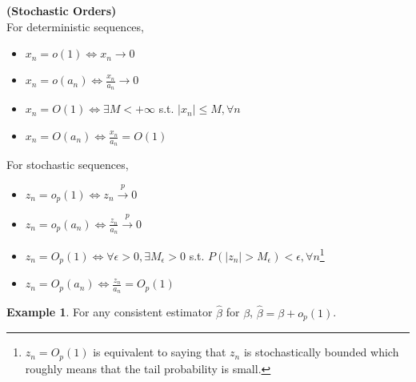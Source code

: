 \documentclass[11pt]{article} %
\theoremstyle{definition}
\numberwithin{defn}{subsection}
\numberwithin{thm}{subsection}
\newtheorem*{rmk}{Remark}
\newtheorem{ex}{Example}
\numberwithin{ex}{subsection}
\newcommand{\plim}{\overset{p}{\rightarrow}}
\begin{document}
\begin{defn}\textbf{(Stochastic Orders)}\\
	For deterministic sequences,
	\begin{itemize}
		\item $x_n=o(1)\iff x_n\rightarrow0$
		\item $x_n=o(a_n)\iff \frac{x_n}{a_n}\rightarrow 0$
		\item $x_n=O(1) \iff \exists M<+\infty$ s.t. $|x_n|\le M,\forall n$
		\item $x_n=O(a_n) \iff \frac{x_n}{a_n}=O(1)$
	\end{itemize}
	For stochastic sequences, 
	\begin{itemize}
		\item $z_n=o_p(1)\iff z_n\plim 0$
		\item $z_n=o_p(a_n)\iff\frac{z_n}{a_n}\plim 0$
		\item $z_n=O_p(1)\iff \forall\epsilon>0,\exists M_{\epsilon}>0$ s.t. $P(|z_n|>M_{\epsilon})<\epsilon,\forall n$\footnote{$z_n=O_p(1)$ is equivalent to saying that $z_n$ is stochastically bounded which roughly means that the tail probability is small.}
		\item $z_n=O_p(a_n)\iff\frac{z_n}{a_n}=O_p(1)$
	\end{itemize}
\end{defn}


\begin{ex} For any consistent estimator $\hat{\beta}$ for $\beta$, $\hat{\beta}=\beta+o_p(1)$.
\end{ex}
\end{document}
